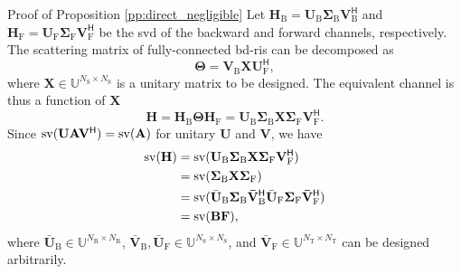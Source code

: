 \begin{appendix}
\begin{subsection}{Proof of Proposition \ref{pp:direct_negligible}}\label{ap:direct_negligible}
	Let $\mathbf{H}_\mathrm{B} = \mathbf{U}_\mathrm{B} \mathbf{\Sigma}_\mathrm{B} \mathbf{V}_\mathrm{B}^\mathsf{H}$ and $\mathbf{H}_\mathrm{F} = \mathbf{U}_\mathrm{F} \mathbf{\Sigma}_\mathrm{F} \mathbf{V}_\mathrm{F}^\mathsf{H}$ be the \gls{svd} of the backward and forward channels, respectively.
	The scattering matrix of fully-connected \gls{bd}-\gls{ris} can be decomposed as
	\begin{equation}
		\mathbf{\Theta} = \mathbf{V}_\mathrm{B} \mathbf{X} \mathbf{U}_\mathrm{F}^\mathsf{H},
		\label{eq:scattering_fc}
	\end{equation}
	where $\mathbf{X} \in \mathbb{U}^{N_\mathrm{S} \times N_\mathrm{S}}$ is a unitary matrix to be designed.
	The equivalent channel is thus a function of $\mathbf{X}$
	\begin{equation}
		\mathbf{H} = \mathbf{H}_\mathrm{B} \mathbf{\Theta} \mathbf{H}_\mathrm{F} = \mathbf{U}_\mathrm{B} \mathbf{\Sigma}_\mathrm{B} \mathbf{X} \mathbf{\Sigma}_\mathrm{F} \mathbf{V}_\mathrm{F}^\mathsf{H}.
		\label{eq:channel_equivalent_fc}
	\end{equation}
	Since $\operatorname{sv}(\mathbf{U} \mathbf{A} \mathbf{V}^\mathsf{H}) = \operatorname{sv}(\mathbf{A})$ for unitary $\mathbf{U}$ and $\mathbf{V}$, we have
	\begin{equation}
		\label{eq:sv_factorization}
		\begin{split}
			\operatorname{sv}(\mathbf{H}) & = \operatorname{sv}(\mathbf{U}_\mathrm{B} \mathbf{\Sigma}_\mathrm{B} \mathbf{X} \mathbf{\Sigma}_\mathrm{F} \mathbf{V}_\mathrm{F}^\mathsf{H})                                                                     \\
			                & = \operatorname{sv}(\mathbf{\Sigma}_\mathrm{B} \mathbf{X} \mathbf{\Sigma}_\mathrm{F})                                                                                                                            \\
			                & = \operatorname{sv}(\bar{\mathbf{U}}_\mathrm{B} \mathbf{\Sigma}_\mathrm{B} \mathbf{\bar{V}}_\mathrm{B}^\mathsf{H} \bar{\mathbf{U}}_\mathrm{F} \mathbf{\Sigma}_\mathrm{F} \mathbf{\bar{V}}_\mathrm{F}^\mathsf{H}) \\
			                & = \operatorname{sv}(\mathbf{BF}),
		\end{split}
	\end{equation}
	where $\bar{\mathbf{U}}_{\mathrm{B}} \in \mathbb{U}^{N_\mathrm{R} \times N_\mathrm{R}}$, $\bar{\mathbf{V}}_\mathrm{B}, \bar{\mathbf{U}}_\mathrm{F} \in \mathbb{U}^{N_\mathrm{S} \times N_\mathrm{S}}$, and $\bar{\mathbf{V}}_\mathrm{F} \in \mathbb{U}^{N_\mathrm{T} \times N_\mathrm{T}}$ can be designed arbitrarily.
\end{subsection}


\end{appendix}

